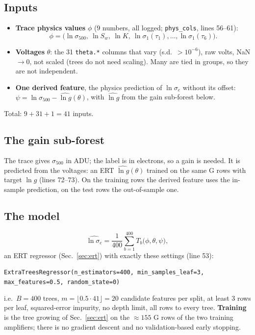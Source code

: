 \documentclass[10pt,a4paper]{article}
\newcommand{\code}[1]{\texttt{\small #1}}
\begin{document}
\subsection{Inputs}
\begin{itemize}
\item \textbf{Trace physics values} $\phi$ (9 numbers, all logged; \code{phys\_cols}, lines 56--61):
\begin{equation}
\phi=\big(\ln\sigma_{500},\ \ln S_w,\ \ln K,\ \ln\sigma_1(\tau_1),\dots,\ln\sigma_1(\tau_6)\big).
\end{equation}
\item \textbf{Voltages} $\theta$: the 31 \code{theta.*} columns that vary (s.d.\ $>10^{-6}$), raw volts, NaN$\to0$, not scaled
  (trees do not need scaling). Many are tied in groups, so they are not independent.
\item \textbf{One derived feature}, the physics prediction of $\ln\sigma_e$ without its offset:
  $\psi=\ln\sigma_{500}-\widehat{\ln g}(\theta)$, with $\widehat{\ln g}$ from the gain sub-forest below.
\end{itemize}
Total: $9+31+1=41$ inputs.

\subsection{The gain sub-forest}
The trace gives $\sigma_{500}$ in ADU; the label is in electrons, so a gain is needed. It is predicted from the voltages:
an ERT $\widehat{\ln g}(\theta)$ trained on the same G rows with target $\ln g$ (lines 72--73). On the training rows the
derived feature uses the in-sample prediction, on the test rows the out-of-sample one.

\subsection{The model}
\begin{equation}
\widehat{\ln\sigma_e}=\frac1{400}\sum_{b=1}^{400}T_b\big(\phi,\theta,\psi\big),
\end{equation}
an ERT regressor (Sec.~\ref{sec:ert}) with exactly these settings (line 53):
\begin{center}\code{ExtraTreesRegressor(n\_estimators=400, min\_samples\_leaf=3, max\_features=0.5, random\_state=0)}\end{center}
i.e.\ $B=400$ trees, $m=\lfloor0.5\cdot41\rfloor=20$ candidate features per split, at least 3 rows per leaf, squared-error
impurity, no depth limit, all rows to every tree. \textbf{Training} is the tree growing of Sec.~\ref{sec:ert} on the
$\approx155$ G rows of the two training amplifiers; there is no gradient descent and no validation-based early stopping.
\end{document}

